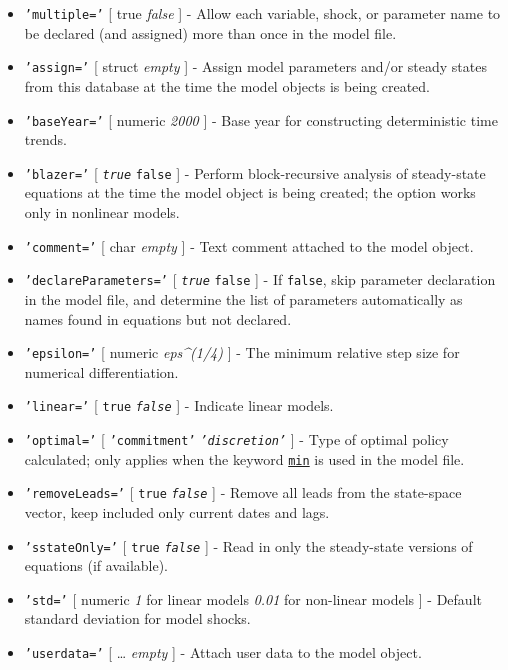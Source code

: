 \begin{itemize}
\item
  \texttt{'multiple='} {[} true \textbar{} \emph{false} {]} - Allow each
  variable, shock, or parameter name to be declared (and assigned) more
  than once in the model file.
\item
  \texttt{'assign='} {[} struct \textbar{} \emph{empty} {]} - Assign
  model parameters and/or steady states from this database at the time
  the model objects is being created.
\item
  \texttt{'baseYear='} {[} numeric \textbar{} \emph{2000} {]} - Base
  year for constructing deterministic time trends.
\item
  \texttt{'blazer='} {[} \emph{\texttt{true}} \textbar{} \texttt{false}
  {]} - Perform block-recursive analysis of steady-state equations at
  the time the model object is being created; the option works only in
  nonlinear models.
\item
  \texttt{'comment='} {[} char \textbar{} \emph{empty} {]} - Text
  comment attached to the model object.
\item
  \texttt{'declareParameters='} {[} \emph{\texttt{true}} \textbar{}
  \texttt{false} {]} - If \texttt{false}, skip parameter declaration in
  the model file, and determine the list of parameters automatically as
  names found in equations but not declared.
\item
  \texttt{'epsilon='} {[} numeric \textbar{} \emph{eps\^{}(1/4)} {]} -
  The minimum relative step size for numerical differentiation.
\item
  \texttt{'linear='} {[} \texttt{true} \textbar{} \emph{\texttt{false}}
  {]} - Indicate linear models.
\item
  \texttt{'optimal='} {[} \texttt{'commitment'} \textbar{}
  \emph{\texttt{'discretion'}} {]} - Type of optimal policy calculated;
  only applies when the keyword \href{modellang/min}{\texttt{min}} is
  used in the model file.
\item
  \texttt{'removeLeads='} {[} \texttt{true} \textbar{}
  \emph{\texttt{false}} {]} - Remove all leads from the state-space
  vector, keep included only current dates and lags.
\item
  \texttt{'sstateOnly='} {[} \texttt{true} \textbar{}
  \emph{\texttt{false}} {]} - Read in only the steady-state versions of
  equations (if available).
\item
  \texttt{'std='} {[} numeric \textbar{} \emph{1} for linear models
  \textbar{} \emph{0.01} for non-linear models {]} - Default standard
  deviation for model shocks.
\item
  \texttt{'userdata='} {[} \ldots{} \textbar{} \emph{empty} {]} - Attach
  user data to the model object.
\end{itemize}

